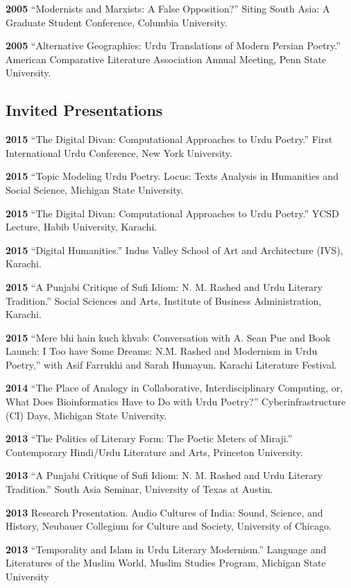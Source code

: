 \documentclass[letterpaper,12pt]{article}
\begin{document}
\textbf{2005}
“Modernists and Marxists: A False Opposition?”
Siting South Asia: A Graduate Student Conference, Columbia University.

\textbf{2005}
“Alternative Geographies: Urdu Translations of Modern Persian Poetry.”
American Comparative Literature Association Annual Meeting, Penn State University.


\subsection{Invited Presentations%
  \label{invited-presentations}%
}

\textbf{2015}
“The Digital Divan: Computational Approaches to Urdu Poetry.” First International Urdu Conference, New York University.

\textbf{2015}
“Topic Modeling Urdu Poetry.\textquotedbl{} Locus: Texts Analysis in Humanities and Social Science, Michigan State University.

\textbf{2015}
“The Digital Divan: Computational Approaches to Urdu Poetry.”
YCSD Lecture, Habib University, Karachi.

\textbf{2015}
“Digital Humanities.”
Indus Valley School of Art and Architecture (IVS), Karachi.

\textbf{2015}
“A Punjabi Critique of Sufi Idiom: N. M. Rashed and Urdu Literary Tradition.”
Social Sciences and Arts, Institute of Business Administration, Karachi.

\textbf{2015}
“Mere bhi hain kuch khvab: Conversation with A. Sean Pue and Book Launch: I Too have Some Dreams: N.M. Rashed and Modernism in Urdu Poetry,” with Asif Farrukhi and Sarah Humayun.
Karachi Literature Festival.

\textbf{2014}
“The Place of Analogy in Collaborative, Interdisciplinary Computing,
or,
What Does Bioinformatics Have to Do with Urdu Poetry?”
Cyberinfrastructure (CI) Days, Michigan State University.

\textbf{2013}
“The Politics of Literary Form: The Poetic Meters of Miraji.”
Contemporary Hindi/Urdu Literature and Arts, Princeton University.

\textbf{2013}
“A Punjabi Critique of Sufi Idiom: N. M. Rashed and Urdu Literary Tradition.”
South Asia Seminar, University of Texas at Austin.

\textbf{2013}
Research Presentation.
Audio Cultures of India: Sound, Science, and History,
Neubauer Collegium for Culture and Society, University of Chicago.

\textbf{2013}
“Temporality and Islam in Urdu Literary Modernism.”
Language and Literatures of the Muslim World,
Muslim Studies Program,
Michigan State University
\end{document}
